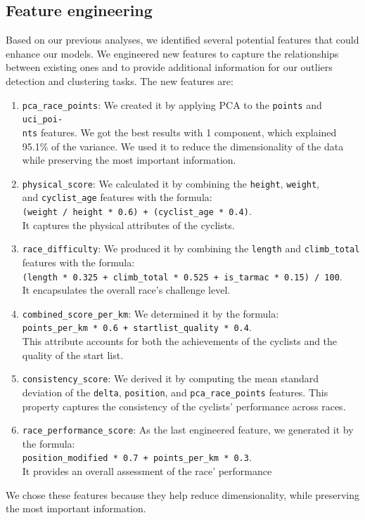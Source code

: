 \documentclass[a4paper, twoside]{article}
\begin{document}
\subsection{Feature engineering}
Based on our previous analyses, we identified several potential features that could enhance our models. We engineered new features to capture the relationships between existing ones and to provide additional information for our outliers detection and clustering tasks. The new features are:
\begin{enumerate}[noitemsep]
    \item \texttt{pca\_race\_points}: We created it by applying PCA to the \texttt{points} and \texttt{uci\_poi-\\nts} features. We got the best results with 1 component, which explained 95.1\% of the variance. We used it to reduce the dimensionality of the data while preserving the most important information.
    \item \texttt{physical\_score}: We calculated it by combining the \texttt{height}, \texttt{weight}, \\ and \texttt{cyclist\_age} features with the formula: \\
    \verb|(weight / height * 0.6) + (cyclist_age * 0.4)|. \\
    It captures the physical attributes of the cyclists.
    \item \texttt{race\_difficulty}: We produced it by combining the \texttt{length} and \texttt{climb\_total} features with the formula: \\
    \verb|(length * 0.325 + climb_total * 0.525 + is_tarmac * 0.15) / 100|. \\
    It encapsulates the overall race's challenge level.
    \item \texttt{combined\_score\_per\_km}: We determined it by the formula: \\
    \verb|points_per_km * 0.6 + startlist_quality * 0.4|. \\
    This attribute accounts for both the achievements of the cyclists and the quality of the start list.
    \item \texttt{consistency\_score}: We derived it by computing the mean standard deviation of the \texttt{delta}, \texttt{position}, and \texttt{pca\_race\_points} features. This property captures the consistency of the cyclists' performance across races.
    \item \texttt{race\_performance\_score}: As the last engineered feature, we generated it by the formula: \\
    \verb|position_modified * 0.7 + points_per_km * 0.3|. \\
    It provides an overall assessment of the race' performance
\end{enumerate}
We chose these features because they help reduce dimensionality, while preserving the most important information.
\end{document}
